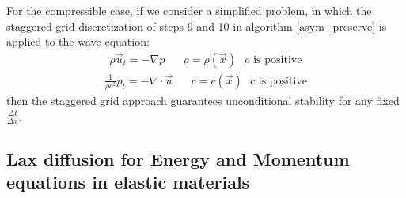 \documentclass[]{article}
\begin{document}
For the compressible case, if we consider a simplified problem,
in which the staggered grid 
discretization of steps 9 and 10 in algorithm \ref{asym_preserve}
is applied to the wave equation:
\begin{eqnarray}
\rho\vec{u}_{t}=-\nabla p  \hspace{20pt} \rho=\rho(\vec{x}) \mbox{  $\rho$ is positive}
\end{eqnarray}
\begin{eqnarray}
\frac{1}{\rho c^{2}} p_{t}=-\nabla\cdot\vec{u} \hspace{20pt} c=c(\vec{x}) \mbox{  $c$ is positive}
\end{eqnarray}
then the staggered grid approach guarantees unconditional stability for any
fixed $\frac{\Delta t}{\Delta x}$.

\subsection{Lax diffusion for Energy and Momentum equations in 
elastic materials }
\end{document}
